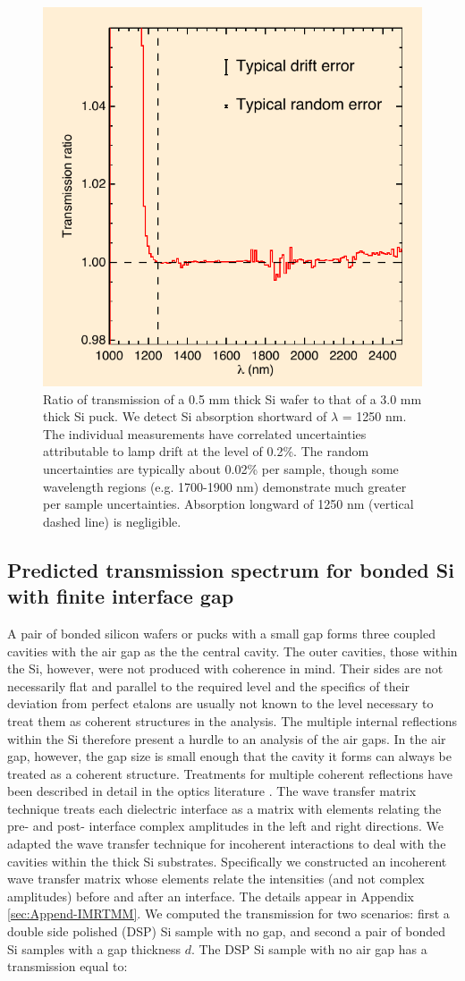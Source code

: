 \begin{figure}[htbp]
\includegraphics[width=0.40\columnwidth]{chSiGaps/figs/fpAbsorbfig_alt}
\caption{Ratio of transmission of a 0.5 mm thick Si wafer to that of a 3.0 mm thick Si puck.  \label{figSiAbsorbfig} We detect Si absorption shortward of $\lambda$ = 1250 nm.  The individual measurements have correlated uncertainties attributable to lamp drift at the level of 0.2\%.  The random uncertainties are typically about 0.02\% per sample, though some wavelength regions (e.g. 1700-1900 nm) demonstrate much greater per sample uncertainties.  Absorption longward of 1250 nm (vertical dashed line) is negligible.}
\end{figure}

\subsection{Predicted transmission spectrum for bonded Si with finite interface gap}
\label{secTheory}
A pair of bonded silicon wafers or pucks with a small gap forms three coupled cavities with the air gap as the the central cavity.  The outer cavities, those within the Si, however, were not produced with coherence in mind.  Their sides are not necessarily flat and parallel to the required level and the specifics of their deviation from perfect etalons are usually not known to the level necessary to treat them as coherent structures in the analysis.  The multiple internal reflections within the Si therefore present a hurdle to an analysis of the air gaps.  In the air gap, however, the gap size is small enough that the cavity it forms can always be treated as a coherent structure.  Treatments for multiple coherent reflections have been described in detail in the optics literature \cite{2007fuph.book.....S}.  The wave transfer matrix technique treats each dielectric interface as a matrix with elements relating the pre- and post- interface complex amplitudes in the left and right directions.  We adapted the wave transfer technique for incoherent interactions \cite{2002ApOpt..41.3978K} to deal with the cavities within the thick Si substrates.  Specifically we constructed an incoherent wave transfer matrix whose elements relate the intensities (and not complex amplitudes) before and after an interface.  The details appear in Appendix \ref{sec:Append-IMRTMM}.  We computed the transmission for two scenarios: first a double side polished (DSP) Si sample with no gap, and second a pair of bonded Si samples with a gap thickness $d$.  The DSP Si sample with no air gap has a transmission equal to:

